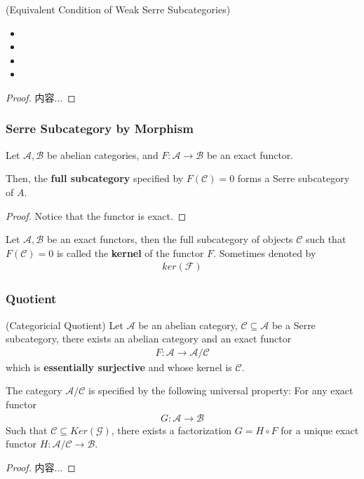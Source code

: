 \documentclass[Total.tex]{subfiles}
\begin{document}
					\begin{lemma}
						(Equivalent Condition of Weak Serre Subcategories)
						\begin{itemize}
							\item 
							\item 
							\item 
							\item 
						\end{itemize}
					\end{lemma}
					\begin{proof}
						内容...
					\end{proof}
					\subsubsection{Serre Subcategory by Morphism}
						\begin{lemma}
							Let $\mathcal{A},\mathcal{B}$ be abelian categories, and $F:\mathcal{A}\rightarrow \mathcal{B}$ be an exact functor.
							
							Then, the \textbf{full subcategory} specified by $F(\mathcal{C})=0$ forms a Serre subcategory of $A$.
						\end{lemma}
						\begin{proof}
							Notice that the functor is exact.
						\end{proof}
						
						\begin{Def}
							Let $\mathcal{A},\mathcal{B}$ be an exact functors, then the full subcategory of objects $\mathcal{C}$ such that $F(\mathcal{C})=0$ is called the \textbf{kernel} of the functor $F$. Sometimes denoted by
							\begin{gather*}
								ker(\mathcal{F})
							\end{gather*} 
						\end{Def}
					\subsubsection{Quotient}
						\begin{lemma}
							(Categoricial Quotient) Let $\mathcal{A}$ be an abelian category, $\mathcal{C}\subseteq\mathcal{A}$ be a Serre subcategory, there exists an abelian category and an exact functor
							\begin{gather*}
								F:\mathcal{A}\rightarrow \mathcal{A}/\mathcal{C}
							\end{gather*}
							which is \textbf{essentially surjective} and whose kernel is $\mathcal{C}$.
							
							The category $\mathcal{A}/\mathcal{C}$ is specified by the following universal property: For any exact functor
							\begin{gather*}
								G:\mathcal{A}\rightarrow \mathcal{B}
							\end{gather*} 
							Such that $\mathcal{C}\subseteq Ker(\mathcal{G})$, there exists a factorization $G=H\circ F$ for a unique exact functor $H:\mathcal{A}/\mathcal{C}\rightarrow \mathcal{B}$.
						\end{lemma}
						\begin{proof}
							内容...
						\end{proof}
						
\end{document}
